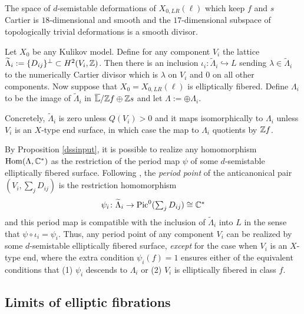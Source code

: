 \documentclass[table,x11names]{amsart}
\begin{document}
The space of $d$-semistable deformations of $X_{0,LR}(\ell)$ 
which keep $f$ and $s$ Cartier is $18$-dimensional and smooth and the
$17$-dimensional subspace of topologically trivial deformations
is a smooth divisor. 

\begin{definition}\label{lambdalatt}
Let $X_0$ be any Kulikov model. Define for any component $V_i$
the lattice $\widetilde{\Lambda}_i:=\{D_{ij}\}^\perp\subset H^2(V_i,\mathbb{Z})$. Then
there is an inclusion $\iota_i\colon \widetilde{\Lambda}_i\hookrightarrow L$
sending $\lambda\in \widetilde{\Lambda}_i $ to
the numerically Cartier divisor
which is $\lambda$ on $V_i$ and $0$ on all other components.
Now suppose that $X_0 = X_{0,LR}(\ell)$ is elliptically fibered.
Define $\Lambda_i$ to be the image of $\widetilde{\Lambda}_i$ in
$\overline{\mathbb{L}}/\mathbb{Z} f\oplus \mathbb{Z} s$ and let $\Lambda := \oplus \Lambda_i$.
\end{definition}

Concretely, $\widetilde{\Lambda}_i$ is zero unless $Q(V_i)> 0$ and it maps
isomorphically to $\Lambda_i$ unless $V_i$ is an $X$-type end surface, in which
case the map to $\Lambda_i$ quotients by $\mathbb{Z} f$.

\begin{remark}\label{surjperiods}
By Proposition \ref{dssinput}, it is possible to realize any homomorphism
$\operatorname{Hom}(\Lambda,\mathbb{C}^*)$ as the restriction of the period map $\psi$
of some $d$-semistable elliptically fibered surface. Following 
\cite{gross2015moduli-of-surfaces}, \cite{friedman2015on-the-geometry}
the {\it period point} of the anticanonical pair $(V_i, \sum_j D_{ij})$ is the 
restriction homomorphism
$$\psi_i\colon \widetilde{\Lambda}_i \to {\rm Pic}^0(\textstyle\sum_j D_{ij})\cong \mathbb{C}^*$$
and this period map is compatible with the inclusion of $\widetilde{\Lambda}_i$
into $L$ in the sense that $\psi\circ \iota_i = \psi_i$. Thus, any period
point of any component $V_i$ can be realized by
some $d$-semistable elliptically fibered surface, {\it except} for the case
when $V_i$ is an $X$-type end, where the extra condition $\psi_i(f)=1$ ensures
either of the equivalent conditions that (1) $\psi_i$ descends to $\Lambda_i$
or (2) $V_i$ is elliptically fibered in class $f$.


\end{remark}

\subsection{Limits of elliptic fibrations}
\end{document}
